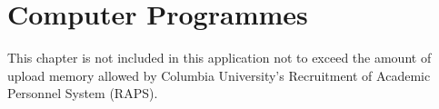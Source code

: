 \hypertarget{chapter5}{}
\chapter{Computer Programmes}

This chapter is not included in this application not to exceed the amount of upload memory allowed by Columbia University's Recruitment of Academic Personnel System (RAPS).